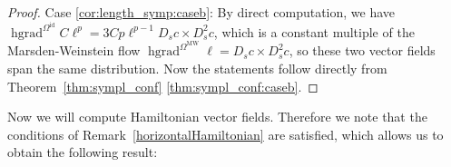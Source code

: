 \documentclass[12pt]{amsart}
\theoremstyle{definition}
\newcommand{\R}{\mathbb R}
\newcommand{\Diffp}{\operatorname{Diff}^+(S^1)}
\newcommand{\id}{\mathrm{id}}
\newcommand{\Imm}{\mathrm{Imm}}
\newcommand{\OmMW}{\Omega^{\operatorname{MW}}}
\def\Th{\Theta}
\def\Ph{\Phi}
\def\Om{\Omega}
\def\x{\times}
\def\R{{\mathbb R}}
\let\on=\operatorname
\begin{document}
\begin{proof}
Case \ref{cor:length_symp:caseb}: By direct computation, we have $\on{hgrad}^{\Om^\id}C\ell^p=3 Cp \ell^{p-1} D_s c \x D_s^2 c$, which is a constant multiple of the Marsden-Weinstein flow $\on{hgrad}^{\OmMW}\ell=D_s c \x D_s ^2 c$, so these two vector fields span the same distribution. Now the statements follow directly from Theorem~\ref{thm:sympl_conf} \ref{thm:sympl_conf:caseb}.
\end{proof}

Now we will compute Hamiltonian vector fields. Therefore we  note that the conditions of Remark~\ref{horizontalHamiltonian} are satisfied, which allows us to obtain the following result:
\end{document}

